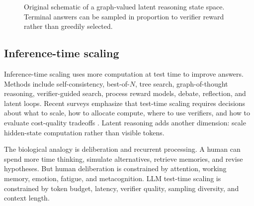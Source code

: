 \documentclass[11pt]{article}
\newcommand{\1}{\mathbf{1}}
\begin{document}
\begin{figure}[H]
\centering
{}
\caption{Original schematic of a graph-valued latent reasoning state space. Terminal answers can be sampled in proportion to verifier reward rather than greedily selected.}
\label{fig:gflownet_got}
\end{figure}

\subsection{Inference-time scaling}

Inference-time scaling uses more computation at test time to improve answers. Methods include self-consistency, best-of-$N$, tree search, graph-of-thought reasoning, verifier-guided search, process reward models, debate, reflection, and latent loops. Recent surveys emphasize that test-time scaling requires decisions about what to scale, how to allocate compute, where to use verifiers, and how to evaluate cost-quality tradeoffs \cite{ZhangTTSSurvey2025,Balachandran2025,LiSearch2025}. Latent reasoning adds another dimension: scale hidden-state computation rather than visible tokens.

The biological analogy is deliberation and recurrent processing. A human can spend more time thinking, simulate alternatives, retrieve memories, and revise hypotheses. But human deliberation is constrained by attention, working memory, emotion, fatigue, and metacognition. LLM test-time scaling is constrained by token budget, latency, verifier quality, sampling diversity, and context length.
\end{document}
